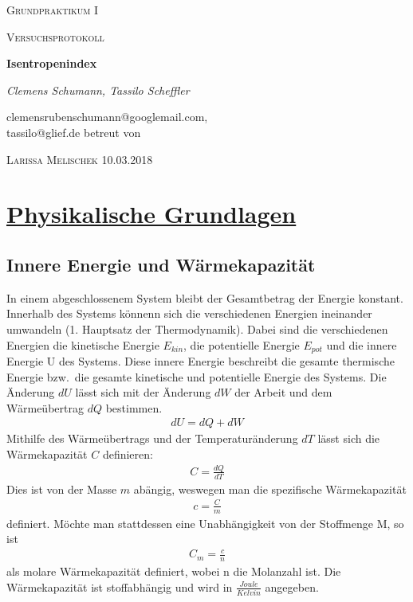 \documentclass[11pt,a4paper]{article}
\begin{document}
 
 \begin{center}
  {\scshape\LARGE Grundpraktikum I \par}
  \vspace{1cm}
  {\scshape\Large Versuchsprotokoll\par}
  \vspace{1.5cm}
  {\huge\bfseries Isentropenindex\par}
  \vspace{2cm}
     {\large \itshape{Clemens Schumann, Tassilo Scheffler}\/ \par}
  \vspace{0.5cm}
  {clemensrubenschumann@googlemail.com, \\ tassilo@glief.de}
  \vfill
  betreut von\par
  \textsc{Larissa Melischek}
  \vfill
  {\Large 10.03.2018}
 
 \end{center}
 
 \thispagestyle{empty}
 
 \newpage
 \setcounter{page}{1}
 \tableofcontents
 \newpage
 \section{\underline{Physikalische Grundlagen}}
 \subsection{Innere Energie und W\"armekapazit\"at}
 In einem abgeschlossenem System bleibt der Gesamtbetrag der Energie konstant.
 Innerhalb des Systems k\"onnenn sich die verschiedenen Energien ineinander umwandeln
 (1. Hauptsatz der Thermodynamik). Dabei sind die verschiedenen Energien die
 kinetische Energie $E_{kin}$, die potentielle Energie $E_{pot}$ und die innere Energie U
 des Systems. Diese innere Energie beschreibt die gesamte thermische Energie bzw.\ die
 gesamte kinetische und potentielle Energie des Systems. Die \"Anderung $dU$
 l\"asst sich mit der \"Anderung $dW$ der Arbeit und dem W\"arme\"ubertrag $dQ$
 bestimmen.
 \begin{align}
     \label{f1}
     dU=dQ+dW
 \end{align}
 Mithilfe des W\"arme\"ubertrags und der Temperatur\"anderung $dT$ l\"asst sich die
 W\"armekapazit\"at $C$ definieren:
 \begin{align}
     \label{f2}
     C=\frac{dQ}{dT}
 \end{align}
 Dies ist von der Masse $m$ ab\"angig, weswegen man die spezifische W\"armekapazit\"at
 \begin{align}
     \label{f3}
     c=\frac{C}{m}
 \end{align}
 definiert. M\"ochte man stattdessen eine Unabh\"angigkeit von der Stoffmenge M, so ist
 \begin{align}
     \label{f4}
     C_{m}=\frac{c}{n}
 \end{align}
 als molare W\"armekapazit\"at definiert, wobei n die Molanzahl ist. Die
 W\"armekapazit\"at ist stoffabh\"angig und wird in $\frac{Joule}{Kelvin}$ angegeben.
\end{document}

